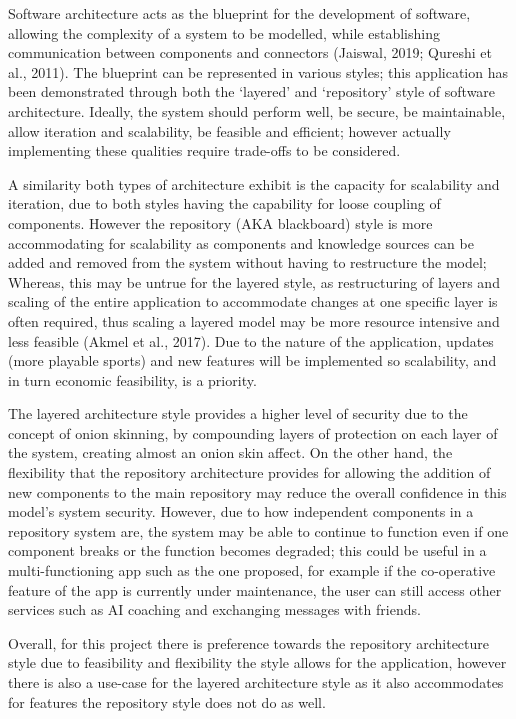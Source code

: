 \documentclass[a4paper]{article}
\begin{document}
	Software architecture acts as the blueprint for the development of software, allowing the complexity of a system to be modelled, while establishing communication between components and connectors (Jaiswal, 2019; Qureshi et al., 2011)\cite{ref2,ref3}. The blueprint can be represented in various styles; this application has been demonstrated through both the `layered' and `repository' style of software architecture. Ideally, the system should perform well, be secure, be maintainable, allow iteration and scalability, be feasible and efficient; however actually implementing these qualities require trade-offs to be considered.\par
	A similarity both types of architecture exhibit is the capacity for scalability and iteration, due to both styles having the capability for loose coupling of components. However the repository (AKA blackboard) style is more accommodating for scalability as components and knowledge sources can be added and removed from the system without having to restructure the model; Whereas, this may be untrue for the layered style, as restructuring of layers and scaling of the entire application to accommodate changes at one specific layer is often required, thus scaling a layered model may be more resource intensive and less feasible (Akmel et al., 2017)\cite{ref1}. Due to the nature of the application, updates (more playable sports) and new features will be implemented so scalability, and in turn economic feasibility, is a priority.\par
	The layered architecture style provides a higher level of security due to the concept of onion skinning, by compounding layers of protection on each layer of the system, creating almost an onion skin affect. On the other hand, the flexibility that the repository architecture provides for allowing the addition of new components to the main repository may reduce the overall confidence in this model's system security. However, due to how independent components in a repository system are, the system may be able to continue to function even if one component breaks or the function becomes degraded; this could be useful in a multi-functioning app such as the one proposed, for example if the co-operative feature of the app is currently under maintenance, the user can still access other services such as AI coaching and exchanging messages with friends.\par
	Overall, for this project there is preference towards the repository architecture style due to feasibility and flexibility the style allows for the application, however there is also a use-case for the layered architecture style as it also accommodates for features the repository style does not do as well.
\end{document}
